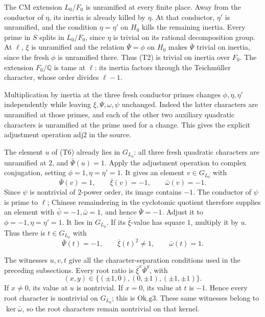 The CM extension \(L_0/F_0\) is unramified at every
finite place.
Away from the conductor of \(\eta\), its inertia is
already killed by \(\eta\).
At that conductor, \(\eta'\) is unramified, and the
condition \(\eta=\eta'\) on \(H_0\) kills the remaining
inertia.
Every prime in \(S\) splits in \(L_0/F_0\), since
\(\eta\) is trivial on its rational decomposition group.
At \(\ell\), \(\xi\) is unramified and the relation
\(\bar\Psi=\phi\) on \(H_0\) makes \(\bar\Psi\)
trivial on inertia, since the fresh \(\phi\) is
unramified there.
Thus (T2) is trivial on inertia over \(F_0\).
The extension \(F_0/\mathbb Q\) is tame at \(\ell\):
its inertia factors through the Teichm\"uller character,
whose order divides \(\ell-1\).

Multiplication by inertia at the three fresh conductor
primes changes \(\phi,\eta,\eta'\) independently while
leaving \(\xi,\Psi,\omega,\psi\) unchanged.
Indeed the latter characters are unramified at those
primes, and each of the other two auxiliary quadratic
characters is unramified at the prime used for a change.
This gives the explicit adjustment operation
\(\mathrm{adj2}\) in the source.

The element \(u\) of (T6) already lies in \(G_{L_0}\):
all three fresh quadratic characters are unramified
at \(2\), and \(\bar\Psi(u)=1\).
Apply the adjustment operation to complex conjugation,
setting \(\phi=1,\eta=\eta'=1\).
It gives an element \(v\in G_{L_0}\) with
\[
       \bar\Psi(v)=1,\qquad\bar\xi(v)=-1,\qquad
                                      \bar\omega(v)=-1 .
 \tag{T8}
\]
Since \(\psi\) is nontrivial of \(2\)-power order,
its image contains \(-1\).
The conductor of \(\psi\) is prime to \(\ell\);
Chinese remaindering in the cyclotomic quotient
therefore supplies an element with
\(\bar\psi=-1,\bar\omega=1\), and hence
\(\bar\Psi=-1\).
Adjust it to \(\phi=-1,\eta=\eta'=1\).
It lies in \(G_{L_0}\).
If its \(\bar\xi\)-value has square \(1\), multiply
it by \(u\).
Thus there is \(t\in G_{L_0}\) with
\[
       \bar\Psi(t)=-1,\qquad\bar\xi(t)^2\ne1,\qquad
                                      \bar\omega(t)=1 .
 \tag{T9}
\]

The witnesses \(u,v,t\) give all the character-separation
conditions used in the preceding subsections.
Every root ratio is
\(\bar\xi^x\bar\Psi^y\), with
\[
 (x,y)\in\{(\pm1,0),(0,\pm1),(\pm1,\pm1)\}.
\]
If \(x\ne0\), its value at \(u\) is nontrivial.
If \(x=0\), its value at \(t\) is \(-1\).
Hence every root character is nontrivial on \(G_{L_0}\);
this is \(\mathrm{Ok.g3}\).
These same witnesses belong to \(\ker\bar\omega\), so
the root characters remain nontrivial on that kernel.

